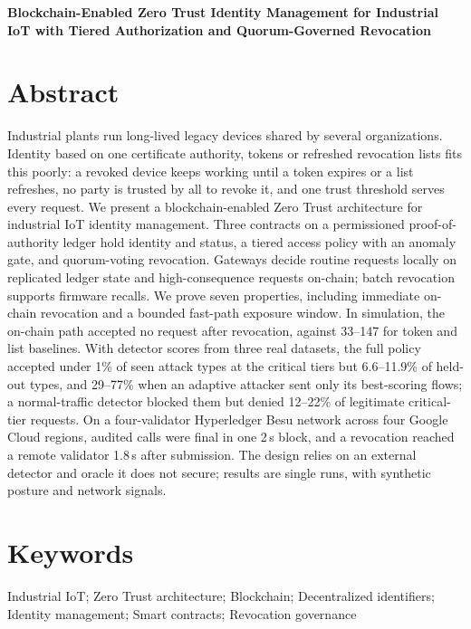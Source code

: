 \documentclass[12pt,a4paper]{article}
\newcommand{\paperTitle}{Blockchain-Enabled Zero Trust Identity Management for Industrial IoT with Tiered Authorization and Quorum-Governed Revocation}
\begin{document}
\pagestyle{plain}
\linenumbers
\begin{center}{\Large\bfseries \paperTitle\par}\end{center}
\section*{Abstract}
\noindent
Industrial plants run long-lived legacy devices shared by several organizations. Identity based on one certificate authority, tokens or refreshed revocation lists fits this poorly: a revoked device keeps working until a token expires or a list refreshes, no party is trusted by all to revoke it, and one trust threshold serves every request. We present a blockchain-enabled Zero Trust architecture for industrial IoT identity management. Three contracts on a permissioned proof-of-authority ledger hold identity and status, a tiered access policy with an anomaly gate, and quorum-voting revocation. Gateways decide routine requests locally on replicated ledger state and high-consequence requests on-chain; batch revocation supports firmware recalls. We prove seven properties, including immediate on-chain revocation and a bounded fast-path exposure window. In simulation, the on-chain path accepted no request after revocation, against 33--147 for token and list baselines. With detector scores from three real datasets, the full policy accepted under 1\% of seen attack types at the critical tiers but 6.6--11.9\% of held-out types, and 29--77\% when an adaptive attacker sent only its best-scoring flows; a normal-traffic detector blocked them but denied 12--22\% of legitimate critical-tier requests. On a four-validator Hyperledger Besu network across four Google Cloud regions, audited calls were final in one 2\,s block, and a revocation reached a remote validator 1.8\,s after submission. The design relies on an external detector and oracle it does not secure; results are single runs, with synthetic posture and network signals.
\section*{Keywords}
Industrial IoT; Zero Trust architecture; Blockchain; Decentralized identifiers; Identity management; Smart contracts; Revocation governance









\end{document}
